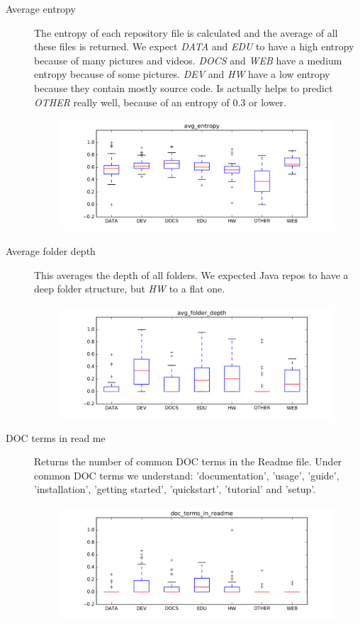 \documentclass[a4paper]{scrartcl}
\begin{document}
		\begin{description}
			\item[Average entropy]
				The entropy of each repository file is calculated and the average of all these files is returned. We expect \emph{DATA} and \emph{EDU} to have a high entropy because of many pictures and videos. \emph{DOCS} and \emph{WEB} have a medium entropy because of some pictures. \emph{DEV} and \emph{HW} have a low entropy because they contain mostly source code. Is actually helps to predict \emph{OTHER} really well, because of an entropy of 0.3 or lower.
				\begin{figure}[h!]
					\centering
					\includegraphics[width=0.75\linewidth]{figures/avg_entropy.png}
				\end{figure}
			\item[Average folder depth]
				This averages the depth of all folders. We expected Java repos to have a deep folder structure, but \emph{HW} to a flat one.
				\begin{figure}[h!]
					\centering
					\includegraphics[width=0.75\linewidth]{figures/avg_folder_depth.png}
				\end{figure}
			\item[DOC terms in read me]
				Returns the number of common DOC terms in the Readme file. Under common DOC terms we understand: 'documentation', 'usage', 'guide', 'installation', 'getting started', 'quickstart', 'tutorial' and 'setup'.
				\begin{figure}[h!]
					\centering
					\includegraphics[width=0.75\linewidth]{figures/doc_terms_in_readme.png}

\end{figure}
\end{description}
\end{document}
